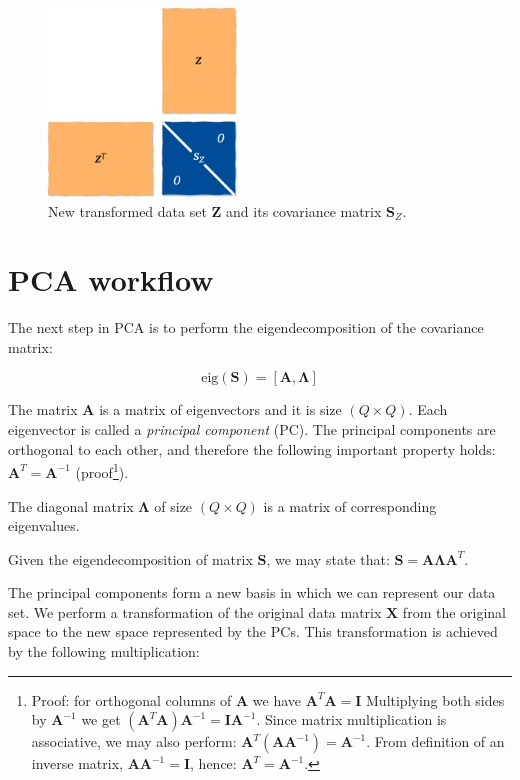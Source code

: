 \documentclass[10pt,twocolumn]{article}
\begin{document}
\begin{figure}[H]
\centering\includegraphics[width=5cm]{PC-scores.png}
\caption{New transformed data set $\bm{Z}$ and its covariance matrix $\bm{S}_Z$.}
\label{fig:PC-scores}
\end{figure}

\section{PCA workflow}

The next step in PCA is to perform the eigendecomposition of the covariance matrix:

\begin{equation} \label{eq:eig-dec}
\text{eig}(\bm{S}) = [\bm{A}, \bm{\Lambda}]
\end{equation}

The matrix $\bm{A}$ is a matrix of eigenvectors and it is size $(Q \times Q)$. Each eigenvector is called a \textit{principal component} (PC). The principal components are orthogonal to each other, and therefore the following important property holds: $\bm{A}^T = \bm{A}^{-1}$ (proof\footnote{Proof: for orthogonal columns of $\bm{A}$ we have $\bm{A}^T \bm{A} = \bm{I}$ Multiplying both sides by $\bm{A}^{-1}$ we get $(\bm{A}^T \bm{A}) \bm{A}^{-1}= \bm{I}\bm{A}^{-1}$. Since matrix multiplication is associative, we may also perform: $\bm{A}^T (\bm{A} \bm{A}^{-1}) = \bm{A}^{-1}$. From definition of an inverse matrix,  $\bm{A} \bm{A}^{-1} = \bm{I}$, hence: $\bm{A}^T = \bm{A}^{-1}$.}).

The diagonal matrix $\bm{\Lambda}$ of size $(Q \times Q)$ is a matrix of corresponding eigenvalues.

Given the eigendecomposition of matrix $\bm{S}$, we may state that: $\bm{S} = \bm{A} \bm{\Lambda} \bm{A}^T$.

The principal components form a new basis in which we can represent our data set. We perform a transformation of the original data matrix $\bm{X}$ from the original space to the new space represented by the PCs. This transformation is achieved by the following multiplication:
\end{document}
